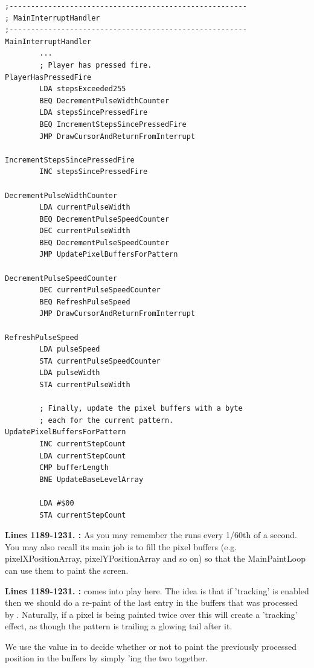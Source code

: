 \clearpage
\begin{lstlisting}[caption=From \icode{MainInterruptHandler}.]
;-------------------------------------------------------
; MainInterruptHandler
;-------------------------------------------------------
MainInterruptHandler
        ...
        ; Player has pressed fire.
PlayerHasPressedFire   
        LDA stepsExceeded255
        BEQ DecrementPulseWidthCounter
        LDA stepsSincePressedFire
        BEQ IncrementStepsSincePressedFire
        JMP DrawCursorAndReturnFromInterrupt

IncrementStepsSincePressedFire   
        INC stepsSincePressedFire

DecrementPulseWidthCounter   
        LDA currentPulseWidth
        BEQ DecrementPulseSpeedCounter
        DEC currentPulseWidth
        BEQ DecrementPulseSpeedCounter
        JMP UpdatePixelBuffersForPattern

DecrementPulseSpeedCounter   
        DEC currentPulseSpeedCounter
        BEQ RefreshPulseSpeed
        JMP DrawCursorAndReturnFromInterrupt

RefreshPulseSpeed   
        LDA pulseSpeed
        STA currentPulseSpeedCounter
        LDA pulseWidth
        STA currentPulseWidth

        ; Finally, update the pixel buffers with a byte
        ; each for the current pattern.        
UpdatePixelBuffersForPattern    
        INC currentStepCount
        LDA currentStepCount
        CMP bufferLength
        BNE UpdateBaseLevelArray

        LDA #$00
        STA currentStepCount
\end{lstlisting}
\clearpage

\textbf{Lines 1189-1231. :} 
As you may remember the  runs every 1/60th of a
second.  You may also recall its main job is to fill the pixel buffers (e.g.
pixelXPositionArray, pixelYPositionArray and so on) so that the MainPaintLoop
can use them to paint the screen. 

\textbf{Lines 1189-1231. :} 
 comes into play here. The idea is that if 'tracking'
is enabled then we should do a re-paint of the last entry in the buffers that was
processed by . Naturally, if a pixel is being painted twice
over this will create a 'tracking' effect, as though the pattern is trailing a 
glowing tail after it.

We use the value in  to decide whether or not to paint
the previously processed position in the buffers by simply 'ing the
two together.

